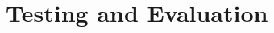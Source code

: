 \documentclass[../main.tex]{subfiles}
\begin{document}
\chapter{Testing and Evaluation} \label{ch:evaluation}
\end{document}
